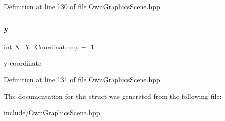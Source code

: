 Definition at line 130 of file Own\+Graphics\+Scene.\+hpp.

\mbox{\label{structX__Y__Coordinates_a4a608b81d10b65d5b12596ca82df34f6}} 
\subsubsection{\texorpdfstring{y}{y}}
{\footnotesize\ttfamily int X\+\_\+\+Y\+\_\+\+Coordinates\+::y = -\/1}

y coordinate 

Definition at line 131 of file Own\+Graphics\+Scene.\+hpp.



The documentation for this struct was generated from the following file\+:\begin{DoxyCompactItemize}
\item 
include/\mbox{\hyperlink{OwnGraphicsScene_8hpp}{Own\+Graphics\+Scene.\+hpp}}\end{DoxyCompactItemize}
